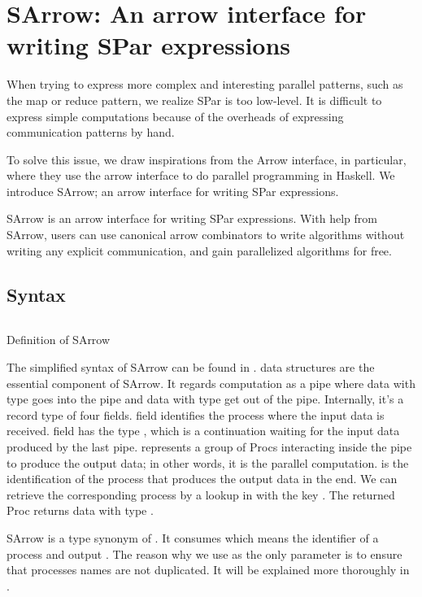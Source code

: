 \chapter{SArrow: An arrow interface for writing SPar expressions} \label{chap:arrow}
When trying to express more complex and interesting parallel patterns, such as the map or reduce pattern, we realize SPar is too low-level. It is difficult to express simple computations because of the overheads of expressing communication patterns by hand. 

To solve this issue, we draw inspirations from the Arrow interface, in particular, \cite{braunArrowsParallelComputation2018} where they use the arrow interface to do parallel programming in Haskell. We introduce SArrow; an arrow interface for writing SPar expressions.

SArrow is an arrow interface for writing SPar expressions. With help from SArrow, users can use canonical arrow combinators to write algorithms without writing any explicit communication, and gain parallelized algorithms for free.

\section{Syntax}
\begin{listing}[ht]
\inputminted{Haskell}{arrow/def.hs} 
\caption{Definition of SArrow}
\label{SArrow:def}
\end{listing}
The simplified syntax of SArrow can be found in .  data structures are the essential component of SArrow. It regards computation as a pipe where data with type  goes into the pipe and data with type  get out of the pipe. Internally, it's a record type of four fields.  field identifies the process where the input data is received.  field has the type , which is a continuation waiting for the input data produced by the last pipe.  represents a group of Procs interacting inside the pipe to produce the output data; in other words, it is the parallel computation.  is the identification of the process that produces the output data in the end. We can retrieve the corresponding process by a lookup in  with the key . The returned Proc returns data with type . 

SArrow is a type synonym of . It consumes  which means the identifier of a process and output . The reason why we use  as the only parameter is to ensure that processes names are not duplicated. It will be explained more thoroughly in .
